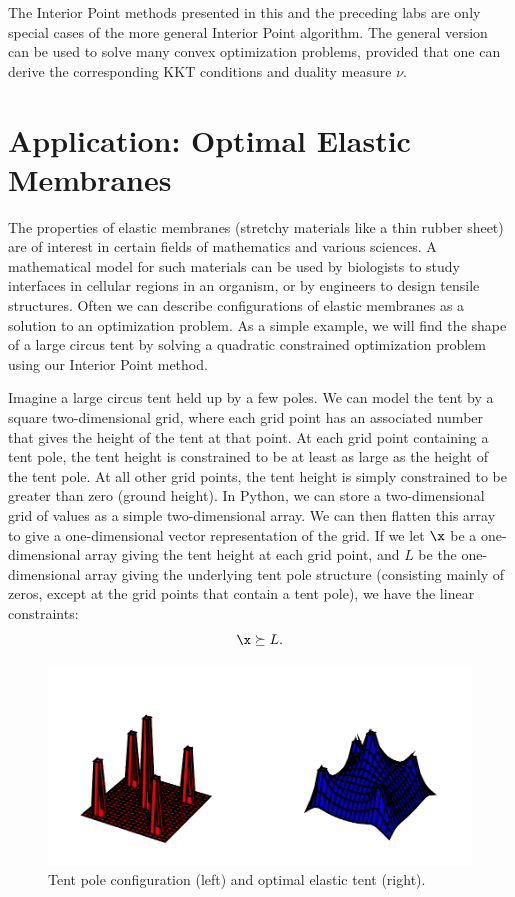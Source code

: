 \begin{info}
The Interior Point methods presented in this and the preceding labs are only special cases of the more general Interior Point algorithm.
The general version can be used to solve many convex optimization problems, provided that one can derive the corresponding KKT conditions and duality measure $\nu$.
\end{info}

\section*{Application: Optimal Elastic Membranes}
The properties of elastic membranes (stretchy materials like a thin rubber sheet) are of interest in certain fields of mathematics and various sciences.
A mathematical model for such materials can be used by biologists to study interfaces in cellular regions in an organism, or by engineers to design tensile structures.
Often we can describe configurations of elastic membranes as a solution to an
optimization problem.
As a simple example, we will find the shape of a large circus tent by solving a quadratic constrained optimization problem using our Interior Point method.

Imagine a large circus tent held up by a few poles.
We can model the tent by a square two-dimensional grid, where each grid point has an associated number that gives the height of the tent at that point.
At each grid point containing a tent pole, the tent height is constrained to be at least as large as the height of the tent pole.
At all other grid points, the tent height is simply constrained to be greater than zero (ground height).
In Python, we can store a two-dimensional grid of values as a simple two-dimensional array.
We can then flatten this array to give a one-dimensional vector representation of the grid.
If we let $\x$ be a one-dimensional array giving the tent height at each grid point, and $L$ be the one-dimensional array giving the underlying tent pole structure (consisting mainly of zeros, except at the grid points that contain a tent pole), we have the linear constraints: \[\x \succeq L.\]

\begin{figure}
\includegraphics[width=\textwidth]{tent.pdf}
\caption{Tent pole configuration (left) and optimal elastic tent (right).}
\label{fig:tent}
\end{figure}

